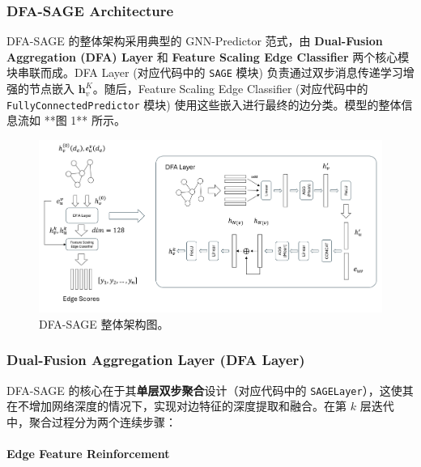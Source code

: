 \documentclass{article}
\begin{document}
\subsubsection{DFA-SAGE Architecture} 

DFA-SAGE 的整体架构采用典型的 GNN-Predictor 范式，由 \textbf{Dual-Fusion Aggregation (DFA) Layer} 和 \textbf{Feature Scaling Edge Classifier} 两个核心模块串联而成。DFA Layer (对应代码中的 \texttt{SAGE} 模块) 负责通过双步消息传递学习增强的节点嵌入 $\mathbf{h}_v^K$。随后，Feature Scaling Edge Classifier (对应代码中的 \texttt{FullyConnectedPredictor} 模块) 使用这些嵌入进行最终的边分类。模型的整体信息流如 **图 1** 所示。




\begin{figure}[htbp]
    \centering
    \includegraphics[width=\textwidth]{images/DFA-SAGE-architecture.png}
    \caption{DFA-SAGE 整体架构图。}
    \label{fig:overall_architecture}
\end{figure}

\subsubsection{Dual-Fusion Aggregation Layer (DFA Layer)}

DFA-SAGE 的核心在于其\textbf{单层双步聚合}设计（对应代码中的 \texttt{SAGELayer}），这使其在不增加网络深度的情况下，实现对边特征的深度提取和融合。在第 $k$ 层迭代中，聚合过程分为两个连续步骤：

\paragraph{Edge Feature Reinforcement}
\end{document}

